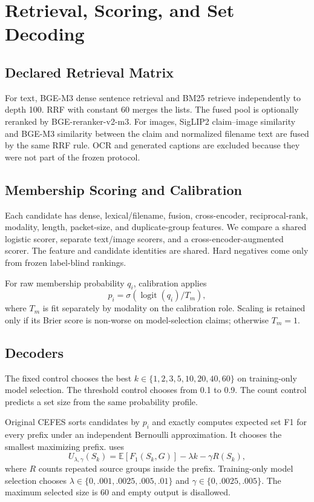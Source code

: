 \section{Retrieval, Scoring, and Set Decoding}

\subsection{Declared Retrieval Matrix}

For text, BGE-M3 dense sentence retrieval and BM25 retrieve independently to depth 100. RRF with constant 60 merges the lists. The fused pool is optionally reranked by BGE-reranker-v2-m3. For images, SigLIP2 claim--image similarity and BGE-M3 similarity between the claim and normalized filename text are fused by the same RRF rule. OCR and generated captions are excluded because they were not part of the frozen protocol.

\subsection{Membership Scoring and Calibration}

Each candidate has dense, lexical/filename, fusion, cross-encoder, reciprocal-rank, modality, length, packet-size, and duplicate-group features. We compare a shared logistic scorer, separate text/image scorers, and a cross-encoder-augmented scorer. The feature and candidate identities are shared. Hard negatives come only from frozen label-blind rankings.

For raw membership probability $q_i$, calibration applies
\begin{equation}
p_i=\sigma(\operatorname{logit}(q_i)/T_m),
\end{equation}
where $T_m$ is fit separately by modality on the calibration role. Scaling is retained only if its Brier score is non-worse on model-selection claims; otherwise $T_m=1$.

\subsection{Decoders}

The fixed control chooses the best $k\in\{1,2,3,5,10,20,40,60\}$ on training-only model selection. The threshold control chooses from 0.1 to 0.9. The count control predicts a set size from the same probability profile.

Original CEFES sorts candidates by $p_i$ and exactly computes expected set F1 for every prefix under an independent Bernoulli approximation. It chooses the smallest maximizing prefix. \method{} uses
\begin{equation}
U_{\lambda,\gamma}(S_k)=\mathbb{E}[F_1(S_k,G)]-\lambda k-\gamma R(S_k),
\label{eq:rc-cefes}
\end{equation}
where $R$ counts repeated source groups inside the prefix. Training-only model selection chooses $\lambda\in\{0,.001,.0025,.005,.01\}$ and $\gamma\in\{0,.0025,.005\}$. The maximum selected size is 60 and empty output is disallowed.

